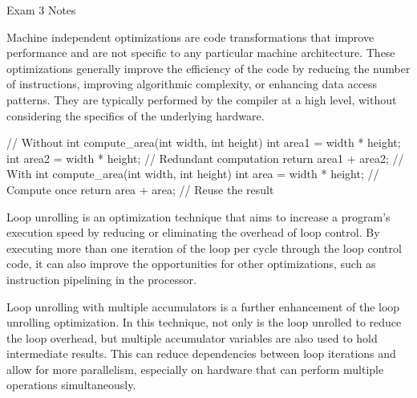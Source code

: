 \begin{examnotes}{Exam 3 Notes}
    \begin{highlight}
        Machine independent optimizations are code transformations that improve performance and are not specific to any particular machine architecture. These optimizations generally improve the 
        efficiency of the code by reducing the number of instructions, improving algorithmic complexity, or enhancing data access patterns. They are typically performed by the compiler at a high 
        level, without considering the specifics of the underlying hardware.

    \begin{code}[C++]
    // Without
    int compute_area(int width, int height) {
        int area1 = width * height;
        int area2 = width * height; // Redundant computation
        return area1 + area2;
    }
    // With
    int compute_area(int width, int height) {
        int area = width * height; // Compute once
        return area + area; // Reuse the result
    }    
    \end{code}
    \end{highlight}

    \begin{highlight}
        Loop unrolling is an optimization technique that aims to increase a program's execution speed by reducing or eliminating the overhead of loop control. By executing more than one iteration 
        of the loop per cycle through the loop control code, it can also improve the opportunities for other optimizations, such as instruction pipelining in the processor.

    \end{highlight}

    \begin{highlight}
        Loop unrolling with multiple accumulators is a further enhancement of the loop unrolling optimization. In this technique, not only is the loop unrolled to reduce the loop overhead, but 
        multiple accumulator variables are also used to hold intermediate results. This can reduce dependencies between loop iterations and allow for more parallelism, especially on hardware that can 
        perform multiple operations simultaneously.


\end{highlight}
\end{examnotes}
